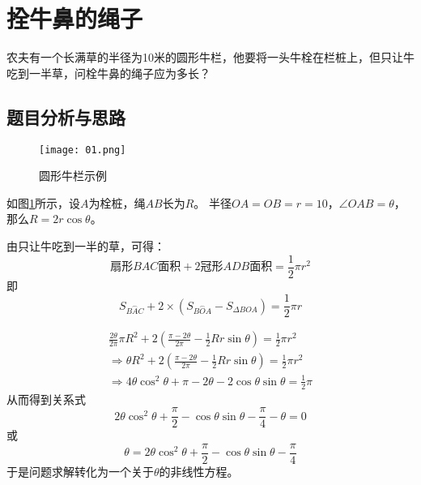 \documentclass{cs202}
\begin{document}

\makecover


\section{拴牛鼻的绳子}

农夫有一个长满草的半径为10米的圆形牛栏，他要将一头牛栓在栏桩上，但只让牛吃到一半草，问栓牛鼻的绳子应为多长？

\subsection{题目分析与思路}

\begin{figure}[H]  
    \centering\texttt{[image: 01.png]}  
    \caption{圆形牛栏示例}     
    \label{img01}   
\end{figure}
    
如图\ref*{img01}所示，设$A$为栓桩，绳$AB$长为$R$。
半径$OA=OB=r=10$，$\angle OAB=\theta$，那么$R=2r\cos\theta$。

由只让牛吃到一半的草，可得：
\begin{equation}
    \mbox{扇形}BAC\mbox{面积} + 2\mbox{冠形}ADB\mbox{面积} = \frac{1}{2}\pi r^2
\end{equation}
即
\[
    S_{\overset{\frown}{BAC}} + 2\times(S_{\overset{\frown}{BOA}} - S_{\Delta BOA}) = \frac{1}{2}\pi r
\]

\begin{equation*}
    \begin{split}
        \frac{2\theta}{2\pi}\pi R^2 + 2(\frac{\pi - 2\theta}{2\pi} - \frac{1}{2}Rr\sin\theta) = \frac{1}{2}\pi r^2 \\
        \Rightarrow \theta R^2 + 2(\frac{\pi - 2\theta}{2\pi} - \frac{1}{2}Rr\sin\theta) = \frac{1}{2}\pi r^2 \\
        \Rightarrow 4\theta\cos^2\theta + \pi - 2\theta - 2\cos\theta\sin\theta = \frac{1}{2}\pi
    \end{split}
\end{equation*}
从而得到关系式
\begin{equation}
    2\theta\cos^2\theta + \frac{\pi}{2} - \cos\theta\sin\theta - \frac{\pi}{4} - \theta = 0 \label{equation:1}
\end{equation}
或
\begin{equation}
    \theta = 2\theta\cos^2\theta + \frac{\pi}{2} - \cos\theta\sin\theta - \frac{\pi}{4}
\end{equation}
于是问题求解转化为一个关于$\theta$的非线性方程。
\end{document}
